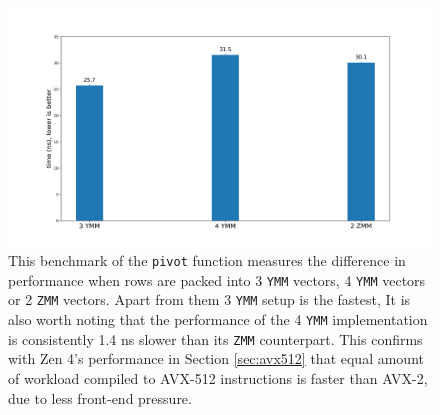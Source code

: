 \documentclass[logo,bsc,singlespacing,parskip]{infthesis}
\newcommand{\pivot}{\texttt{pivot}}
\newcommand{\ymm}{\texttt{YMM}}
\newcommand{\zmm}{\texttt{ZMM}}
\begin{document}
\begin{figure}[H]
    \begin{center}
        \includegraphics[width=\linewidth]{image/3ymm-4ymm-2zmm.png}
    \end{center}
    \caption{This benchmark of the \pivot{} function measures the difference in
    performance when rows are packed into 3 \ymm{} vectors, 4 \ymm{} vectors or 2 \zmm{}
    vectors. Apart from them 3 \ymm{} setup is the fastest, It is also worth noting
    that the performance of the 4 \ymm{} implementation is consistently 1.4 ns
    slower than its \zmm{} counterpart. This confirms with Zen 4's performance
    in Section \ref{sec:avx512} that equal amount of workload compiled to
    AVX-512 instructions is faster than AVX-2, due to less front-end pressure.  
    }
    \label{fig:3ymm-4ymm-2zmm}
\end{figure}
\end{document}
